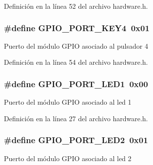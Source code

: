 Definición en la línea 52 del archivo hardware.\+h.

\subsubsection[{\texorpdfstring{G\+P\+I\+O\+\_\+\+P\+O\+R\+T\+\_\+\+K\+E\+Y4}{GPIO_PORT_KEY4}}]{\setlength{\rightskip}{0pt plus 5cm}\#define G\+P\+I\+O\+\_\+\+P\+O\+R\+T\+\_\+\+K\+E\+Y4~0x01}\hypertarget{group__hardware_ga6d16f3a208324c46c462f92ad249d199}{}\label{group__hardware_ga6d16f3a208324c46c462f92ad249d199}
Puerto del módulo G\+P\+IO asociado al pulsador 4 

Definición en la línea 54 del archivo hardware.\+h.

\subsubsection[{\texorpdfstring{G\+P\+I\+O\+\_\+\+P\+O\+R\+T\+\_\+\+L\+E\+D1}{GPIO_PORT_LED1}}]{\setlength{\rightskip}{0pt plus 5cm}\#define G\+P\+I\+O\+\_\+\+P\+O\+R\+T\+\_\+\+L\+E\+D1~0x00}\hypertarget{group__hardware_ga04c3e41fb79d2904c2358a42414bbf7f}{}\label{group__hardware_ga04c3e41fb79d2904c2358a42414bbf7f}
Puerto del módulo G\+P\+IO asociado al led 1 

Definición en la línea 27 del archivo hardware.\+h.

\subsubsection[{\texorpdfstring{G\+P\+I\+O\+\_\+\+P\+O\+R\+T\+\_\+\+L\+E\+D2}{GPIO_PORT_LED2}}]{\setlength{\rightskip}{0pt plus 5cm}\#define G\+P\+I\+O\+\_\+\+P\+O\+R\+T\+\_\+\+L\+E\+D2~0x01}\hypertarget{group__hardware_gab971c6f67d136a9b870fac0f500685d4}{}\label{group__hardware_gab971c6f67d136a9b870fac0f500685d4}
Puerto del módulo G\+P\+IO asociado al led 2 

